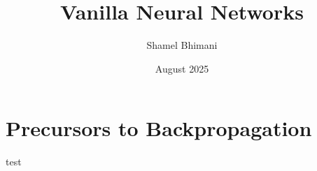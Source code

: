 \documentclass{article}
\title{Vanilla Neural Networks}
\author{Shamel Bhimani}
\date{August 2025}
\theoremstyle{plain}
\theoremstyle{definition}
\theoremstyle{remark}
\begin{document}
\maketitle

\tableofcontents
\newpage


\section{Precursors to Backpropagation}\label{sec:precursors-to-backpropagation}
test
\end{document}

